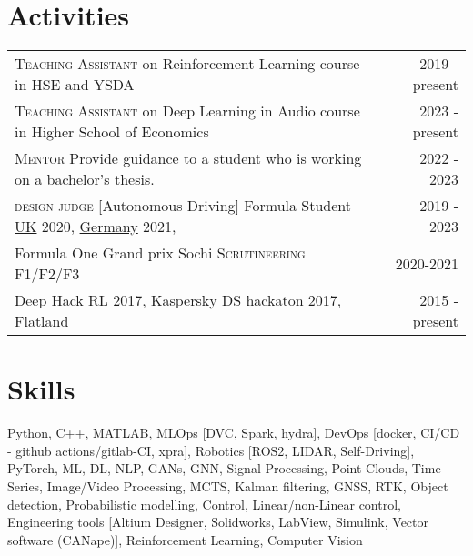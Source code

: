 \documentclass[]{resume}
\begin{document}
\section*{\sectionformat Activities}
\begin{tabular}{@{}L!{\VRule}R}
	{\textsc{Teaching Assistant}} on Reinforcement Learning course in HSE and YSDA               & 2019 - present
	\\
	{\textsc{Teaching Assistant}} on Deep Learning in Audio course in Higher School of Economics & 2023 - present
	\\
	{\textsc{Mentor}} Provide guidance to a student who is working on a bachelor's thesis.       & 2022 - 2023
	\\
	{\textsc{design judge}} [Autonomous Driving] Formula Student  \href{https://www.imeche.org/events/formula-student/team-information/fs-ai}{UK} 2020, \href{https://www.formulastudent.de/fsg/}{Germany} 2021,
	                                                                                             & 2019 - 2023
	\\
	Formula One Grand prix Sochi \textsc{Scrutineering F1/F2/F3}                                 & 2020-2021
	\\
	Deep Hack RL 2017, Kaspersky DS hackaton 2017, Flatland                                      & 2015 - present
\end{tabular}

\section*{\sectionformat Skills}
Python, C++, MATLAB, MLOps [DVC, Spark, hydra], DevOps [docker, CI/CD - github actions/gitlab-CI, xpra], Robotics [ROS2, LIDAR, Self-Driving], PyTorch, ML, DL, NLP, GANs, GNN, Signal Processing, Point Clouds, Time Series, Image/Video Processing,  MCTS, Kalman filtering, GNSS, RTK, Object detection, Probabilistic modelling, Control, Linear/non-Linear control, Engineering tools [Altium Designer, Solidworks, LabView, Simulink,  Vector software (CANape)], Reinforcement Learning, Computer Vision
\end{document}
